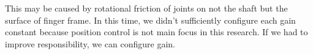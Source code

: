 \documentclass{llncs}
\begin{document}
This may be caused by rotational friction of joints on not the shaft but the surface of finger frame.
In this time, we didn't sufficiently configure each gain constant because position control is not main focus in this research.
If we had to improve responsibility, we can configure gain.

		



\end{document}
